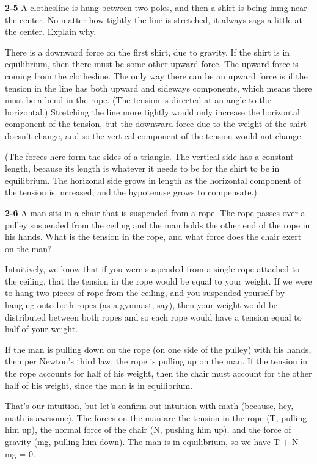 \documentclass{amsart}
\begin{document}
\noindent
\textbf{2-5} A clothesline is hung between two poles, and then a shirt is being hung near the center.
No matter how tightly the line is stretched, it always sags a little at the center.
Explain why.

There is a downward force on the first shirt, due to gravity.
If the shirt is in equilibrium, then there must be some other upward force.
The upward force is coming from the clothesline.
The only way there can be an upward force is if the tension in the line has both upward and sideways components,
which means there must be a bend in the rope.  (The tension is directed at an angle to the horizontal.)
Stretching the line more tightly would only increase the horizontal component of the tension,
but the downward force due to the weight of the shirt doesn't change,
and so the vertical component of the tension would not change.

(The forces here form the sides of a triangle.
The vertical side has a constant length,
because its length is whatever it needs to be for the shirt to be in equilibrium.
The horizonal side grows in length as the horizontal component of the tension is increased, 
and the hypotenuse grows to compensate.)

\vspace{\baselineskip}

\noindent
\textbf{2-6} A man sits in a chair that is suspended from a rope.
The rope passes over a pulley suspended from the ceiling and the man holds the other end
of the rope in his hands.
What is the tension in the rope, and what force does the chair exert on the man?

Intuitively, we know that if you were suspended from a single rope attached to the ceiling, 
that the tension in the rope would be equal to your weight.
If we were to hang two pieces of rope from the ceiling, and you suspended yourself by
hanging onto both ropes (as a gymnast, say), then your weight would be distributed between
both ropes and so each rope would have a tension equal to half of your weight.

If the man is pulling down on the rope (on one side of the pulley) with his hands,
then per Newton's third law, the rope is pulling up on the man.
If the tension in the rope accounts for half of his weight, 
then the chair must account for the other half of his weight, since the man is in equilibrium.

That's our intuition, but let's confirm out intuition with math (because, hey, math is awesome).
The forces on the man are the tension in the rope (T, pulling him up), the normal force of the chair
(N, pushing him up), and the force of gravity (mg, pulling him down).
The man is in equilibrium, so we have T + N - mg = 0.
\end{document}
